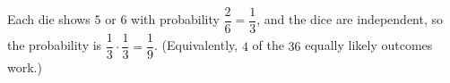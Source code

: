Each die shows $5$ or $6$ with probability $\dfrac26=\dfrac13$, and the dice are independent, so the probability is $\dfrac13\cdot\dfrac13=\boxed{\dfrac19}$. (Equivalently, $4$ of the $36$ equally likely outcomes work.)
